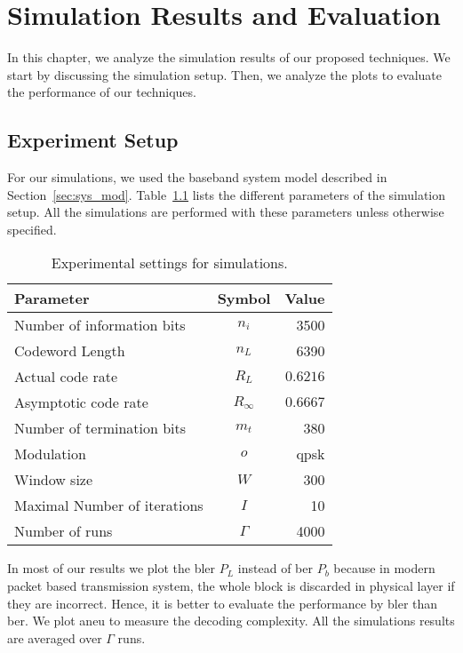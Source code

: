\chapter{Simulation Results and Evaluation}\label{ch:simulation}
In this chapter, we analyze the simulation results of our proposed techniques. We start by discussing the simulation setup. Then, we analyze the plots to evaluate the performance of our techniques.

\section{Experiment Setup}
For our simulations, we used the baseband system model described in Section~\ref{sec:sys_mod}. Table~\ref{tab:sim_param} lists the different parameters of the simulation setup. All the simulations are performed with these parameters unless otherwise specified.
\begin{table}[htbp]
\centering
\begin{tabular}{|l|c|r|}
  \hline
  \textbf{Parameter} &\textbf{Symbol} &\textbf{Value}\\
  \hline
  \hline
  Number of information bits &$n_i$ &3500\\
  \hline
  Codeword Length &$n_L$ &6390\\
  \hline
  Actual code rate &$R_L$ &$0.6216$\\
  \hline
  Asymptotic code rate &$R_\infty$ &$0.6667$\\
  \hline
  Number of termination bits &$m_t$ &380\\
  \hline
  Modulation &$o$ &\gls{qpsk}\\
  \hline
  Window size &$W$ &300\\
  \hline
  Maximal Number of iterations &$I$ &10\\
  \hline
  Number of runs &$\Gamma$ &4000\\
  \hline
\end{tabular}
\caption{Experimental settings for simulations.}
\label{tab:sim_param}
\end{table}

In most of our results we plot the \acrfull{bler} $P_L$ instead of \acrfull{ber} $P_b$ because in modern packet based transmission system, the whole block is discarded in physical layer if they are incorrect. Hence, it is better to evaluate the performance by \gls{bler} than \gls{ber}. We plot \acrfull{aneu} to measure the decoding complexity. All the simulations results are averaged over $\Gamma$ runs.
